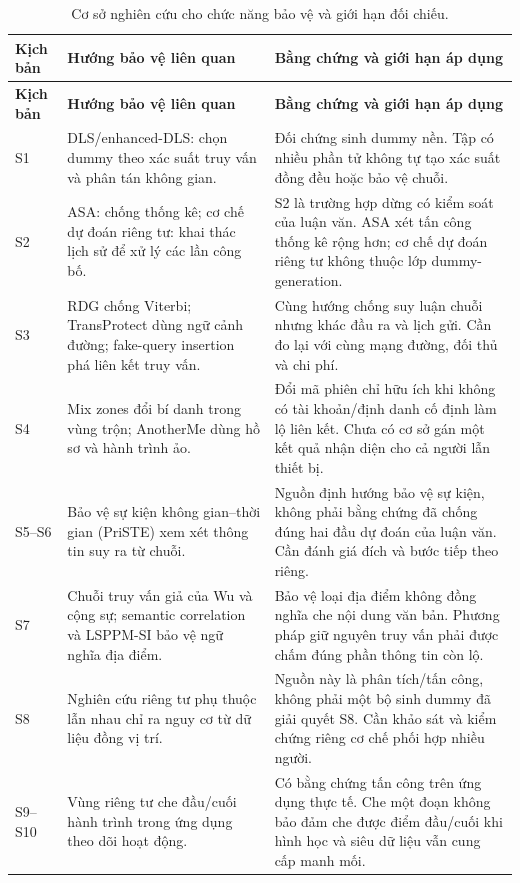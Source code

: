 \documentclass[12pt,a4paper,oneside]{report}
\begin{document}
\begingroup\small{}
\begin{longtable}{P{1.35cm}P{5.0cm}P{8.0cm}}
\caption{Cơ sở nghiên cứu cho chức năng bảo vệ và giới hạn đối chiếu.}
\label{tab:scenario-related}\\
\toprule
\textbf{Kịch bản} & \textbf{Hướng bảo vệ liên quan} & \textbf{Bằng chứng và giới hạn áp dụng}\\
\midrule\endfirsthead
\toprule\textbf{Kịch bản} & \textbf{Hướng bảo vệ liên quan} & \textbf{Bằng chứng và giới hạn áp dụng}\\
\midrule\endhead
\bottomrule\endfoot
S1 & DLS/enhanced-DLS: chọn dummy theo xác suất truy vấn và phân tán không gian.~\citep{niu2014dls}
& Đối chứng sinh dummy nền. Tập có nhiều phần tử không tự tạo xác suất đồng đều hoặc bảo vệ chuỗi.\\
\midrule
S2 & ASA: chống thống kê; cơ chế dự đoán riêng tư: khai thác lịch sử để xử lý các lần công bố.~\citep{sun2017asa,chatzikokolakis2014predictive}
& S2 là trường hợp dừng có kiểm soát của luận văn. ASA xét tấn công thống kê rộng hơn; cơ chế dự đoán riêng tư không thuộc lớp dummy-generation.\\
\midrule
S3 & RDG chống Viterbi; TransProtect dùng ngữ cảnh đường; fake-query insertion phá liên kết truy vấn.~\citep{shaham2021viterbi,yadav2024transprotect,liu2026fakequeries}
& Cùng hướng chống suy luận chuỗi nhưng khác đầu ra và lịch gửi. Cần đo lại với cùng mạng đường, đối thủ và chi phí.\\
\midrule
S4 & Mix zones đổi bí danh trong vùng trộn; AnotherMe dùng hồ sơ và hành trình ảo.~\citep{beresford2004mixzones,li2024anotherme}
& Đổi mã phiên chỉ hữu ích khi không có tài khoản/định danh cố định làm lộ liên kết. Chưa có cơ sở gán một kết quả nhận diện cho cả người lẫn thiết bị.\\
\midrule
S5--S6 & Bảo vệ sự kiện không gian--thời gian (PriSTE) xem xét thông tin suy ra từ chuỗi.~\citep{cao2019priste}
& Nguồn định hướng bảo vệ sự kiện, không phải bằng chứng đã chống đúng hai đầu dự đoán của luận văn. Cần đánh giá đích và bước tiếp theo riêng.\\
\midrule
S7 & Chuỗi truy vấn giả của Wu và cộng sự; semantic correlation và LSPPM-SI bảo vệ ngữ nghĩa địa điểm.~\citep{wu2021fakequery,liu2026semantic,kuang2025lsppm}
& Bảo vệ loại địa điểm không đồng nghĩa che nội dung văn bản. Phương pháp giữ nguyên truy vấn phải được chấm đúng phần thông tin còn lộ.\\
\midrule
S8 & Nghiên cứu riêng tư phụ thuộc lẫn nhau chỉ ra nguy cơ từ dữ liệu đồng vị trí.~\citep{olteanu2017interdependent}
& Nguồn này là phân tích/tấn công, không phải một bộ sinh dummy đã giải quyết S8. Cần khảo sát và kiểm chứng riêng cơ chế phối hợp nhiều người.\\
\midrule
S9--S10 & Vùng riêng tư che đầu/cuối hành trình trong ứng dụng theo dõi hoạt động.~\citep{dhondt2022endpoint}
& Có bằng chứng tấn công trên ứng dụng thực tế. Che một đoạn không bảo đảm che được điểm đầu/cuối khi hình học và siêu dữ liệu vẫn cung cấp manh mối.\\
\end{longtable}
\endgroup
\end{document}

